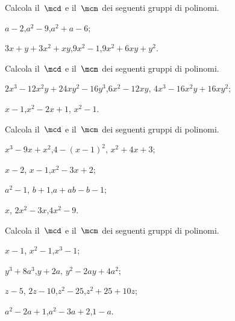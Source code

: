 \begin{esercizio}[\Ast]
\label{ese:13.94}
Calcola il~$\mcd$ e il~$\mcm$ dei seguenti gruppi di polinomi.
\begin{enumeratea}
 \item $a-2$,\quad $a^{2}-9$,\quad $a^{2}+a-6$;
 \item $3x+y+3x^{2}+xy$,\quad $9x^{2}-1$,\quad $9x^{2}+6xy+y^{2}$.
\end{enumeratea}
\end{esercizio}

\begin{esercizio}[\Ast]
\label{ese:13.95}
Calcola il~$\mcd$ e il~$\mcm$ dei seguenti gruppi di polinomi.
\begin{enumeratea}
 \item $2x^{3}-12x^{2}y+24xy^{2}-16y^{3}$,\quad $6x^{2}-12xy$, $4x^{3}-16x^{2}y+16xy^{2}$;
 \item $x-1$,\quad $x^{2}-2x+1$, $x^{2}-1$.%
\end{enumeratea}
\end{esercizio}

\begin{esercizio}
\label{ese:13.96}
Calcola il~$\mcd$ e il~$\mcm$ dei seguenti gruppi di polinomi.
\begin{multicols}{2}
\begin{enumeratea}
 \item $x^{3}-9x+x^{2}$,\quad $4-(x-1)^{2}$, $x^{2}+4x+3$;
 \item $x-2$, $x-1$,\quad $x^{2}-3x+2$;
 \item $a^{2}-1$, $b+1$,\quad $a+ab-b-1$;
 \item $x$, $2x^{2}-3x$,\quad $4x^{2}-9$.
\end{enumeratea}
\end{multicols}
\end{esercizio}

\begin{esercizio}
\label{ese:13.97}
Calcola il~$\mcd$ e il~$\mcm$ dei seguenti gruppi di polinomi.
\begin{multicols}{2}
\begin{enumeratea}
 \item $x-1$, $x^{2}-1$,\quad $x^{3}-1$;
 \item $y^{3}+8a^{3}$,\quad $y+2a$, $y^{2}-2ay+4a^{2}$;
 \item $z-5$, $2z-10$,\quad $z^{2}-25$,\quad $z^{2}+25+10z$;
 \item $a^{2}-2a+1$,\quad $a^{2}-3a+2$,\quad $1-a$.
\end{enumeratea}
\end{multicols}
\end{esercizio}

